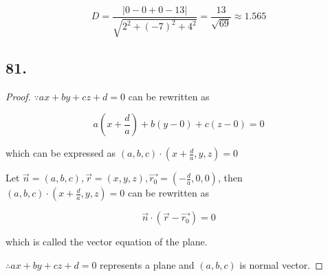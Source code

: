 \documentclass{article}
\begin{document}
    $$D = \frac{|0 - 0 + 0 - 13|}{\sqrt{2^2 + (-7)^2 + 4^2}} = \frac{13}{\sqrt{69}} \approx 1.565$$

    \subsection*{81.}

    \begin{proof}
        $\because ax + by + cz + d = 0$ can be rewritten as

        $$a(x+\frac d a) + b(y - 0) + c(z - 0) = 0$$

        which can be expressed as $(a, b, c) \cdot (x + \frac d a, y, z) = 0$

        Let $\overrightarrow{n} = (a, b, c), \overrightarrow{r} = (x, y, z), \overrightarrow{r_0} = (-\frac d a, 0, 0)$, then $(a, b, c) \cdot (x + \frac d a, y, z) = 0$ can be rewritten as
        
        $$\overrightarrow{n} \cdot (\overrightarrow{r} - \overrightarrow{r_0}) = 0$$

        which is called the vector equation of the plane.

        $\therefore ax+by+cz+d=0$ represents a plane and $(a, b, c)$ is normal vector.

    \end{proof}
\end{document}
